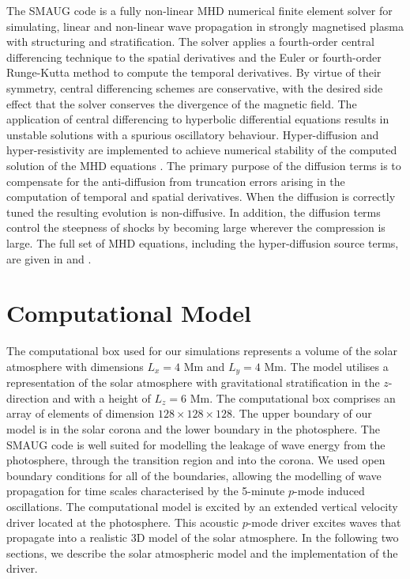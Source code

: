 \documentclass{aastex62}
\begin{document}
The SMAUG code is a fully non-linear MHD numerical finite element solver for simulating, linear and non-linear wave propagation in strongly magnetised plasma with structuring and stratification. The solver applies a fourth-order central differencing technique to the spatial derivatives and the Euler or fourth-order Runge-Kutta method to compute the temporal derivatives. By virtue of their symmetry, central differencing schemes are conservative, with the desired side effect that the solver conserves the divergence of the magnetic field. The application of central differencing to hyperbolic differential equations results in unstable solutions with a spurious oscillatory behaviour.  Hyper-diffusion and hyper-resistivity are implemented to achieve numerical stability of the computed solution of the MHD equations \citep[see for example][]{Caunt2001}.  The primary purpose of the diffusion terms is to compensate for the anti-diffusion from truncation errors arising in the computation of temporal and spatial derivatives. When the diffusion is correctly tuned the resulting evolution is non-diffusive. In addition, the diffusion terms control the steepness of shocks by becoming large wherever the compression is large. The full set of MHD equations, including the hyper-diffusion source terms, are given in  \citet{Shelyag2008} and \citet{Griffiths2015}.


\section{Computational Model}
The computational box used for our simulations represents a volume of the solar atmosphere  with dimensions $L_{ x}= 4$ Mm and $L_{y} =4$ Mm. The model utilises a representation of the solar atmosphere with gravitational stratification in the $z$-direction and with a height of $L_{z} =6$ Mm. The computational box comprises an array of elements of dimension $128 \times128 \times128$. The upper boundary of our model  is in the solar corona and the lower boundary in the photosphere. The SMAUG code is well suited for modelling the leakage of wave energy from the photosphere, through the transition region and into the corona. We used open boundary conditions for all of the boundaries, allowing the modelling of wave propagation for time scales characterised by the 5-minute $p$-mode induced oscillations. The computational model is excited by an extended vertical velocity driver located at the photosphere. This acoustic $p$-mode driver excites waves that propagate into a realistic 3D model of the solar atmosphere. In the following two sections, we describe the solar atmospheric model and the implementation of the driver. 
\end{document}
